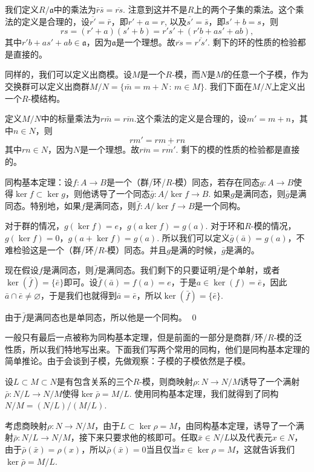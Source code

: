 我们定义$R/\mathfrak{a}$中的乘法为$\bar{r}\bar{s}=\overline{rs}$. 注意到这并不是$R$上的两个子集的乘法。这个乘法的定义是合理的，设$\overline{r'}=\bar{r}$，即$r'+a=r$, 以及$\overline{s'}=\bar{s}$，即$s'+b =s$，则
\[
	rs=(r'+a)(s'+b)=r's'+(r'b+as'+ab),
\]
其中$r'b+as'+ab\in \mathfrak{a}$，因为$\mathfrak{a}$是一个理想。故$\overline{rs}=\overline{r's'}$. 剩下的环的性质的检验都是直接的。

\para 同样的，我们可以定义出商模。设$M$是一个$R$-模，而$N$是$M$的任意一个子模，作为交换群可以定义出商群$M/N=\{\bar{m}=m+N\,:\, m\in M\}$. 我们下面在$M/N$上定义出一个$R$-模结构。

定义$M/N$中的标量乘法为$r\bar{m}=\overline{rm}$.这个乘法的定义是合理的，设$m'=m+n$，其中$n\in N$，则
\[
	rm'=rm+rn
\]
其中$rn\in N$，因为$N$是一个理想。故$\overline{rm}=\overline{rm'}$. 剩下的模的性质的检验都是直接的。

\theo 同构基本定理：设$f:A\to B$是一个（群/环/$R$-模）同态，若存在同态$g: A\to B$使得$\ker f\subset \ker g$，则他诱导了一个同态$\bar{g}:A/\ker{f}\to B$. 如果$g$是满同态，则$\bar{g}$是满同态。特别地，如果$f$是满同态，则$\bar{f}: A/\ker{f}\to B$是一个同构。

\proof
	对于群的情况，$g(\ker f)=e$，$g(a\ker f)=g(a)$. 对于环和$R$-模的情况，$g(\ker f)=0$，$g(a+\ker f)=g(a)$. 所以我们可以定义$\bar{g}(\bar{a})=g(a)$，不难检验这是一个（群/环/$R$-模）同态。并且$g$是满的时候，$\bar{g}$是满的。

	现在假设$f$是满同态，则$\bar{f}$是满同态。我们剩下的只要证明$\bar{f}$是个单射，或者$\ker(\bar{f})=\{\bar{e}\}$即可。设$\bar{f}(\bar{a})=f(a)=e$，于是$a\in \ker(f)=\bar{e}$，因此$\bar{a}\cap \bar{e}\neq\varnothing$，于是我们也就得到$\bar{a}=\bar{e}$，所以$\ker(\bar{f})=\{\bar{e}\}$. 

	由于$\bar{f}$是满同态也是单同态，所以他是一个同构。
\qed

一般只有最后一点被称为同构基本定理，但是前面的一部分是商群/环/$R$-模的泛性质，所以我们特地写出来。下面我们写两个常用的同构，他们是同构基本定理的简单推论。由于会谈到子模，先做观察：子模的子模依然是子模。

\para 设$L\subset M \subset N$是有包含关系的三个$R$-模，则商映射$\rho:N\to N/M$诱导了一个满射$\bar{\rho}:N/L \to N/M$使得$\ker \bar{\rho}=M/L$. 使用同构基本定理，我们就得到了同构$N/M=(N/L)/(M/L)$.

考虑商映射$\rho:N\to N/M$，由于$L\subset \ker \rho=M$，由同构基本定理，诱导了一个满射$\bar{\rho}:N/L \to N/M$，接下来只要求他的核即可。任取$\bar{x}\in N/L$以及代表元$x\in N$，由于$\bar{\rho}(\bar{x})=\rho(x)$，所以$\bar{\rho} (\bar{x})=0$当且仅当$x\in \ker \rho =M$，这就告诉我们$\ker \bar{\rho}=M/L$.

